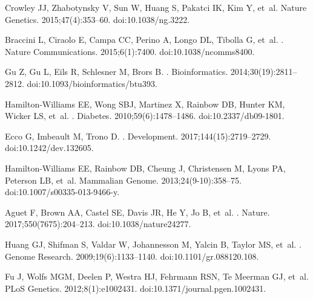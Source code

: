 \documentclass[10pt,letterpaper]{article}
\begin{document}
\begin{thebibliography}{10}
Crowley JJ, Zhabotynsky V, Sun W, Huang S, Pakatci IK, Kim Y, et~al.
\newblock Nature Genetics. 2015;47(4):353--60.
\newblock doi:{10.1038/ng.3222}.

Braccini L, Ciraolo E, Campa CC, Perino A, Longo DL, Tibolla G, et~al.
.
\newblock Nature Communications. 2015;6(1):7400.
\newblock doi:{10.1038/ncomms8400}.

Gu Z, Gu L, Eils R, Schlesner M, Brors B.
.
\newblock Bioinformatics. 2014;30(19):2811--2812.
\newblock doi:{10.1093/bioinformatics/btu393}.

Hamilton-Williams EE, Wong SBJ, Martinez X, Rainbow DB, Hunter KM, Wicker LS,
  et~al.
.
\newblock Diabetes. 2010;59(6):1478--1486.
\newblock doi:{10.2337/db09-1801}.

Ecco G, Imbeault M, Trono D.
.
\newblock Development. 2017;144(15):2719--2729.
\newblock doi:{10.1242/dev.132605}.

Hamilton-Williams EE, Rainbow DB, Cheung J, Christensen M, Lyons PA, Peterson
  LB, et~al.
\newblock Mammalian Genome. 2013;24(9-10):358--75.
\newblock doi:{10.1007/s00335-013-9466-y}.

Aguet F, Brown AA, Castel SE, Davis JR, He Y, Jo B, et~al.
.
\newblock Nature. 2017;550(7675):204--213.
\newblock doi:{10.1038/nature24277}.

Huang GJ, Shifman S, Valdar W, Johannesson M, Yalcin B, Taylor MS, et~al.
.
\newblock Genome Research. 2009;19(6):1133--1140.
\newblock doi:{10.1101/gr.088120.108}.

Fu J, Wolfs MGM, Deelen P, Westra HJ, Fehrmann RSN, {Te Meerman} GJ, et~al.
\newblock PLoS Genetics. 2012;8(1):e1002431.
\newblock doi:{10.1371/journal.pgen.1002431}.


\end{thebibliography}
\end{document}
